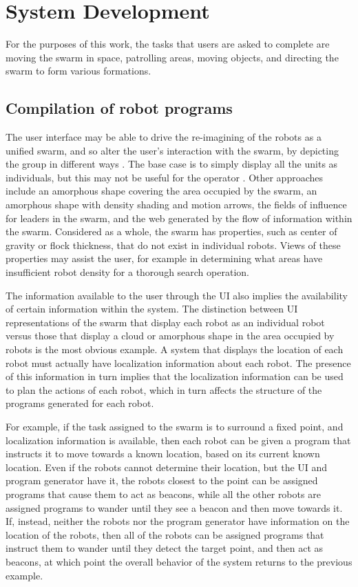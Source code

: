 \chapter{System Development}

For the purposes of this work, the tasks that users are asked to complete are moving the swarm in space, patrolling areas, moving objects, and directing the swarm to form various formations. 

\section{Compilation of robot programs}

The user interface may be able to drive the re-imagining of the robots as a unified swarm, and so alter the user's interaction with the swarm, by depicting the group in different ways \citep{manning2015heuristic}.
The base case is to simply display all the units as individuals, but this may not be useful for the operator \citep{coppin2012controlling}. 
Other approaches include an amorphous shape covering the area occupied by the swarm, an amorphous shape with density shading and motion arrows, the fields of influence for leaders in the swarm, and the web generated by the flow of information within the swarm. 
Considered as a whole, the swarm has properties, such as center of gravity or flock thickness, that do not exist in individual robots. 
Views of these properties may assist the user, for example in determining what areas have insufficient robot density for a thorough search operation. 

The information available to the user through the UI also implies the availability of certain information within the system. 
The distinction between UI representations of the swarm that display each robot as an individual robot versus those that display a cloud or amorphous shape in the area occupied by robots is the most obvious example. 
A system that displays the location of each robot must actually have localization information about each robot.
The presence of this information in turn implies that the localization information can be used to plan the actions of each robot, which in turn affects the structure of the programs generated for each robot. 

For example, if the task assigned to the swarm is to surround a fixed point, and localization information is available, then each robot can be given a program that instructs it to move towards a known location, based on its current known location.
Even if the robots cannot determine their location, but the UI and program generator have it, the robots closest to the point can be assigned programs that cause them to act as beacons, while all the other robots are assigned programs to wander until they see a beacon and then move towards it. 
If, instead, neither the robots nor the program generator have information on the location of the robots, then all of the robots can be assigned programs that instruct them to wander until they detect the target point, and then act as beacons, at which point the overall behavior of the system returns to the previous example.

